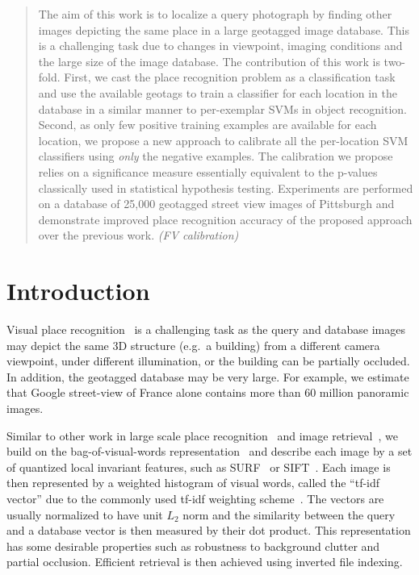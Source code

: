 \begin{abstract}
The aim of this work is to localize a query photograph by finding other images depicting the same place in a large geotagged image database. 
This is a challenging task due to changes in viewpoint, imaging conditions and the large size of the image database. The contribution of this work is two-fold. First, we cast the place recognition problem as a classification task and use the available geotags to train a classifier for each location in the database in a similar manner to per-exemplar SVMs in object recognition. 
\textcolor{myGrey}{
Second, as only few positive training examples are available for each location, we propose a new approach to calibrate all the per-location SVM classifiers using \emph{only} the negative examples. The calibration we propose relies on a significance measure essentially equivalent to the p-values classically used in statistical hypothesis testing. Experiments are performed on a database of 25,000 geotagged street view images of Pittsburgh and demonstrate improved place recognition accuracy of the proposed approach over the previous work.
\emph{(FV calibration)}}
\end{abstract}
\section{Introduction}
   \label{intro}
   Visual place recognition~\cite{Cummins09,Knopp2010,Schindler07} is a challenging task as the query and database images may depict the same 3D structure (e.g.\ a building) from a different camera viewpoint, under different illumination, or the building can be partially occluded. 
   In addition, the geotagged database may be very large. For example, we estimate that Google street-view of France alone contains more than 60 million panoramic images.

   \textcolor{myGrey}{
   Similar to other work in large scale place recognition~\cite{Cummins09,Knopp2010,Schindler07} and image retrieval~\cite{Nister06,Philbin07,Sivic2003}, we build on the bag-of-visual-words representation~\cite{Csurka04,Sivic2003} and describe each image by a set of quantized local invariant features, such as SURF~\cite{Bay06} or SIFT~\cite{Lowe04}.  Each image is then represented by a weighted histogram of visual words, called the ``tf-idf vector'' due to the commonly used tf-idf weighting scheme~\cite{Sivic2003}. The vectors are usually normalized to have unit $L_2$ norm and the similarity between the query and a database vector is then measured by their dot product. This representation has some desirable properties such as robustness to background clutter and partial occlusion. Efficient retrieval is then achieved using inverted file indexing. 
   }

